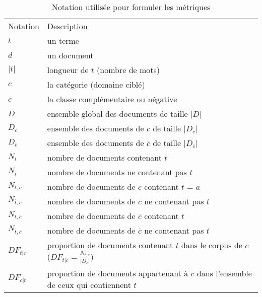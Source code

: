 \begin{table}[!htb]
	\centering
	\begin{tabular}{lp{}}
		\hline\noalign{\smallskip}
		Notation & Description \\
		\noalign{\smallskip}
		\hline
$t$ & un terme \\
$d$& un document \\
$\vert t \vert$ & longueur de $t$ (nombre de mots) \\
$c$ & la catégorie (domaine ciblé) \\
$\overline{c}$ & la classe complémentaire ou négative \\
$D$& ensemble global des documents de taille $\vert D \vert$ \\
$D_{c}$& ensemble des documents de $c$ de taille $\vert D_{c} \vert$ \\%
$D_{\overline{c}}$& ensemble des documents de $\overline{c}$ de taille $\vert D_{\overline{c}} \vert$\\%
$N_{t}$& nombre de documents contenant $t$\\
$N_{\overline{t}}$& nombre de documents ne contenant pas $t$\\
$N_{t,c}$ & nombre de documents de $c$ contenant $t$  = $a$\\
$N_{\overline{t},c}$ & nombre de documents de $c$ ne contenant pas $t$\\%
$N_{t,\overline{c}}$ & nombre de documents de $\overline{c}$ contenant $t$\\%
$N_{\overline{t},\overline{c}}$ & nombre de documents de $\overline{c}$ ne contenant pas $t$\\%
$DF_{t \vert c}$ & proportion de documents contenant $t$ dans le corpus de $c$ ($DF_{t \vert c} = \frac{N_{t,c}}{\vert D_c \vert}$) \\
$DF_{c \vert t}$ & proportion de documents appartenant à $c$ dans l'ensemble de ceux qui contiennent $t$  \\
\hline
\end{tabular}
\caption{Notation utilisée pour formuler les métriques} \label{tab:quanta:notations_metriques}
\end{table}

